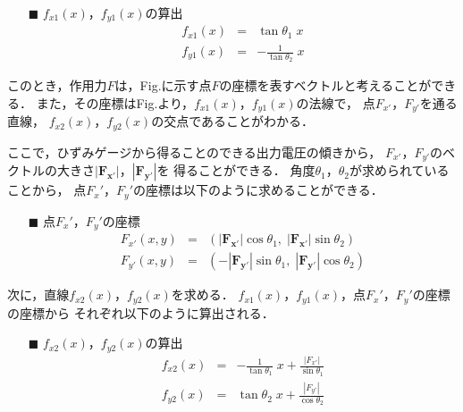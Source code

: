 \documentclass[twocolumn,a4j]{jsarticle}
\begin{document}
\begin{itemize}
    \item [$\blacksquare$] $f_{x1}\left(x\right)$，$f_{y1}\left(x\right)$の算出
          \begin{eqnarray*}
              f_{x1}\left(x\right) &=& \tan \theta_1 \; x\\
              f_{y1}\left(x\right) &=& - \frac{1}{\tan \theta_2}\; x
          \end{eqnarray*}
\end{itemize}

このとき，作用力$F$は，Fig.に示す点$F$の座標を表すベクトルと考えることができる．
また，その座標はFig.より，$f_{x1}\left(x\right)$，$f_{y1}\left(x\right)$の法線で，
点$F_{x'}$，$F_{y'}$を通る直線，
$f_{x2}\left(x\right)$，$f_{y2}\left(x\right)$の交点であることがわかる．\par
ここで，ひずみゲージから得ることのできる出力電圧の傾きから，
$F_{x'}$，$F_{y'}$のベクトルの大きさ$|\boldsymbol{F_{x'}}|$，$|\boldsymbol{F_{y'}}|$を
得ることができる．
角度$\theta_1$，$\theta_2$が求められていることから，
点$F_x'$，$F_y'$の座標は以下のように求めることができる．

\begin{itemize}
    \item [$\blacksquare$] 点$F_x'$，$F_y'$の座標
          \begin{eqnarray*}
              F_{x'} \left(x ,y\right) &=& \left(|\boldsymbol{F_{x'}}| \cos \theta_1,\; |\boldsymbol{F_{x'}}| \sin \theta_2\right)\\
              F_{y'} \left(x ,y\right) &=& \left( - |\boldsymbol{F_{y'}}| \sin \theta_1,\; |\boldsymbol{F_{y'}}| \cos \theta_2\right)
          \end{eqnarray*}
\end{itemize}

次に，直線$f_{x2}\left(x\right)$，$f_{y2}\left(x\right)$を求める．
$f_{x1}\left(x\right)$，$f_{y1}\left(x\right)$，点$F_x'$，$F_y'$の座標の座標から
それぞれ以下のように算出される．

\begin{itemize}
    \item [$\blacksquare$] $f_{x2}\left(x\right)$，$f_{y2}\left(x\right)$の算出
          \begin{eqnarray*}
              f_{x2}\left(x\right) &=& - \frac{1}{\tan \theta_1} \; x + \frac{|F_{x'}|}{\sin \theta_1}\\
              f_{y2}\left(x\right) &=& \tan \theta_2\; x + \frac{|F_{y'}|}{\cos \theta_2}
          \end{eqnarray*}
\end{itemize}
\end{document}
